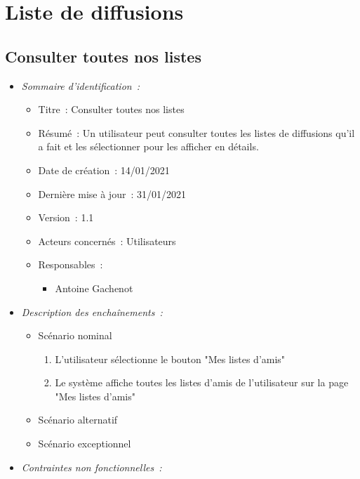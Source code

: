 \section{Liste de diffusions}\label{sec:fonctionnalites-liste_diffusion}

\subsection{Consulter toutes nos listes}\label{subsec:consulter-listes-diffusion}

\begin{itemize}

\item \textit{Sommaire d'identification~:}

    \begin{itemize}
    
    \item Titre~: Consulter toutes nos listes
    
    \item Résumé~: Un utilisateur peut consulter toutes les listes de diffusions qu'il a fait et les sélectionner pour les afficher en détails.
    
    \item Date de création~: 14/01/2021
    
    \item Dernière mise à jour~: 31/01/2021
    
    \item Version~: 1.1
    
    \item Acteurs concernés~: Utilisateurs
    
    \item Responsables~: 
    \begin{itemize}
        \item Antoine Gachenot
    \end{itemize}
    
    \end{itemize}

\item \textit{Description des enchaînements~:}
\begin{itemize}
\item Scénario nominal
    \begin{enumerate}
       \item L'utilisateur sélectionne le bouton "Mes listes d'amis"
       \item Le système affiche toutes les listes d'amis de l'utilisateur sur la page "Mes listes d'amis"
    \end{enumerate}
    \item Scénario alternatif
    \item Scénario exceptionnel
\end{itemize}
\item \textit{Contraintes non fonctionnelles~:}


\end{itemize}
